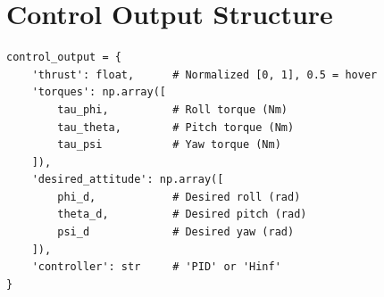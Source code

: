 \section{Control Output Structure}

\begin{lstlisting}[caption={Control output data structure}]
control_output = {
    'thrust': float,      # Normalized [0, 1], 0.5 = hover
    'torques': np.array([
        tau_phi,          # Roll torque (Nm)
        tau_theta,        # Pitch torque (Nm)
        tau_psi           # Yaw torque (Nm)
    ]),
    'desired_attitude': np.array([
        phi_d,            # Desired roll (rad)
        theta_d,          # Desired pitch (rad)
        psi_d             # Desired yaw (rad)
    ]),
    'controller': str     # 'PID' or 'Hinf'
}
\end{lstlisting}

